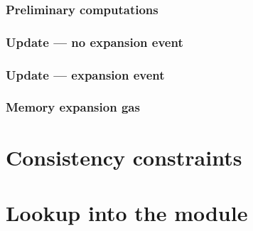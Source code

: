 \subsubsection{Preliminary computations}                                               
\subsubsection{Update --- no expansion event}                                     
\subsubsection{Update --- expansion event}                                           
\subsubsection{Memory expansion gas}                                               \label{mxp: mxp gas cost}
                                                                                                             
\section{Consistency constraints}                                                         \label{mxp: consistency}
                                                                                                             
\section{Lookup into the \idMod{} module}                                                      \label{mxp: instruction decoding lookup}
